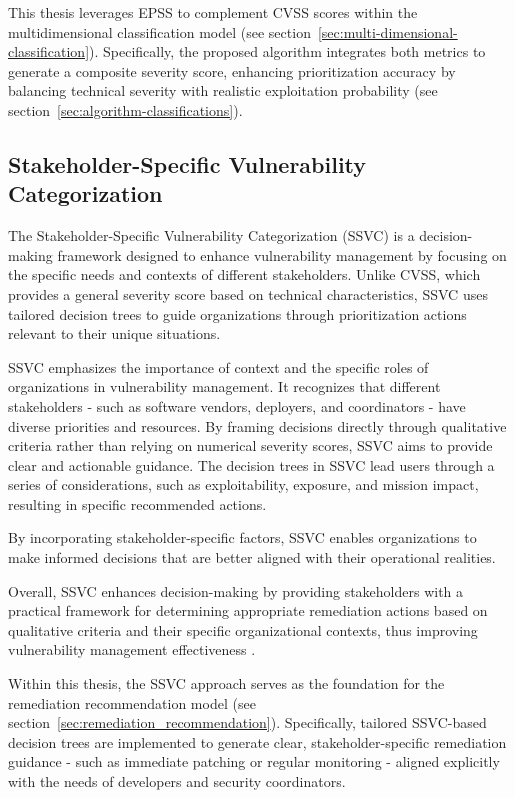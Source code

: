 This thesis leverages \ac{EPSS} to complement \ac{CVSS} scores within the multidimensional classification model (see section~\ref{sec:multi-dimensional-classification}). Specifically, the proposed algorithm integrates both metrics to generate a composite severity score, enhancing prioritization accuracy by balancing technical severity with realistic exploitation probability (see section~\ref{sec:algorithm-classifications}).

\subsection{Stakeholder-Specific Vulnerability Categorization}
\label{subsec:stakeholder-specific-vulnerability}

The Stakeholder-Specific Vulnerability Categorization (\ac{SSVC}) is a decision-making framework designed to enhance vulnerability management by focusing on the specific needs and contexts of different stakeholders. Unlike \ac{CVSS}, which provides a general severity score based on technical characteristics, \ac{SSVC} uses tailored decision trees to guide organizations through prioritization actions relevant to their unique situations.

\ac{SSVC} emphasizes the importance of context and the specific roles of organizations in vulnerability management. It recognizes that different stakeholders  -  such as software vendors, deployers, and coordinators  -  have diverse priorities and resources. By framing decisions directly through qualitative criteria rather than relying on numerical severity scores, \ac{SSVC} aims to provide clear and actionable guidance. The decision trees in \ac{SSVC} lead users through a series of considerations, such as exploitability, exposure, and mission impact, resulting in specific recommended actions.

By incorporating stakeholder-specific factors, \ac{SSVC} enables organizations to make informed decisions that are better aligned with their operational realities.

Overall, \ac{SSVC} enhances decision-making by providing stakeholders with a practical framework for determining appropriate remediation actions based on qualitative criteria and their specific organizational contexts, thus improving vulnerability management effectiveness \autocite{spring_prioritizing_2021}. 

Within this thesis, the \ac{SSVC} approach serves as the foundation for the remediation recommendation model (see section~\ref{sec:remediation_recommendation}). Specifically, tailored \ac{SSVC}-based decision trees are implemented to generate clear, stakeholder-specific remediation guidance - such as immediate patching or regular monitoring - aligned explicitly with the needs of developers and security coordinators.

